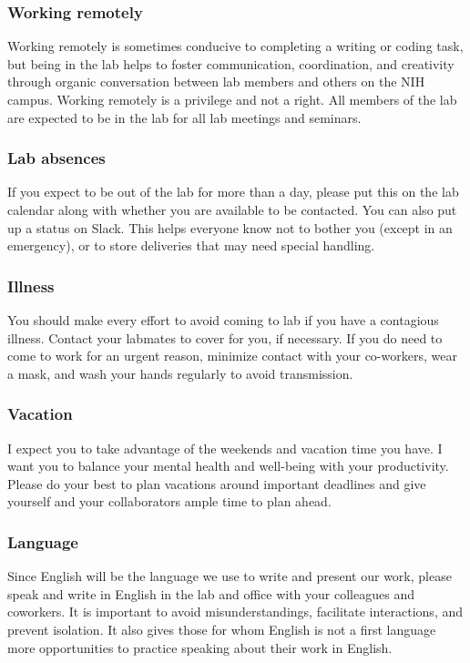 \documentclass[10pt, letterpaper, twocolumn]{article} %
\begin{document}
\subsubsection{Working remotely} Working remotely is sometimes conducive to completing a writing or coding task, but being in the lab helps to foster communication, coordination, and creativity through organic conversation between lab members and others on the NIH campus. Working remotely is a privilege and not a right. All members of the lab are expected to be in the lab for all lab meetings and seminars.

\subsubsection{Lab absences} If you expect to be out of the lab for more than a day, please put this on the lab calendar along with whether you are available to be contacted. You can also put up a status on Slack. This helps everyone know not to bother you (except in an emergency), or to store deliveries that may need special handling.

\subsubsection{Illness} You should make every effort to avoid coming to lab if you have a contagious illness. Contact your labmates to cover for you, if necessary. If you do need to come to work for an urgent reason, minimize contact with your co-workers, wear a mask, and wash your hands regularly to avoid transmission.

\subsubsection{Vacation} I expect you to take advantage of the weekends and vacation time you have. I want you to balance your mental health and well-being with your productivity. Please do your best to plan vacations around important deadlines and give yourself and your collaborators ample time to plan ahead.

\subsubsection{Language}
Since English will be the language we use to write and present our work, please speak and write in English in the lab and office with your colleagues and coworkers. It is important to avoid misunderstandings, facilitate interactions, and prevent isolation. It also gives those for whom English is not a first language more opportunities to practice speaking about their work in English.
\end{document}
